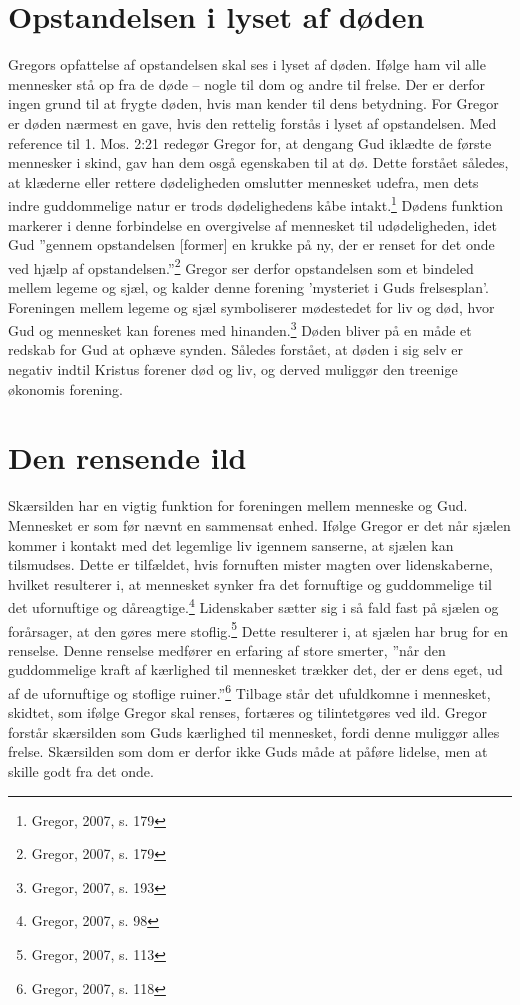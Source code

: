 \section{Opstandelsen i lyset af døden}
Gregors opfattelse af opstandelsen skal ses i lyset af døden. Ifølge ham vil alle mennesker stå op fra de døde -- nogle til dom og andre til frelse. Der er derfor ingen grund til at frygte døden, hvis man kender til dens betydning. For Gregor er døden nærmest en gave, hvis den rettelig forstås i lyset af opstandelsen. Med reference til 1. Mos. 2:21 redegør Gregor for, at dengang Gud iklædte de første mennesker i skind, gav han dem osgå egenskaben til at dø. Dette forstået således, at klæderne eller rettere dødeligheden omslutter mennesket udefra, men dets indre guddommelige natur er trods dødelighedens kåbe intakt.\footnote{Gregor, 2007, s. 179} Dødens funktion markerer i denne forbindelse en overgivelse af mennesket til udødeligheden, idet Gud ”gennem opstandelsen [former] en krukke på ny, der er renset for det onde ved hjælp af opstandelsen.”\footnote{Gregor, 2007, s. 179} Gregor ser derfor opstandelsen som et bindeled mellem legeme og sjæl, og kalder denne forening 'mysteriet i Guds frelsesplan'. Foreningen mellem legeme og sjæl symboliserer mødestedet for liv og død, hvor Gud og mennesket kan forenes med hinanden.\footnote{Gregor, 2007, s. 193} Døden bliver på en måde et redskab for Gud at ophæve synden. Således forstået, at døden i sig selv er negativ indtil Kristus forener død og liv, og derved muliggør den treenige økonomis forening.

\section{Den rensende ild}
Skærsilden har en vigtig funktion for foreningen mellem menneske og Gud. Mennesket er som før nævnt en sammensat enhed. Ifølge Gregor er det når sjælen kommer i kontakt med det legemlige liv igennem sanserne, at sjælen kan tilsmudses. Dette er tilfældet, hvis fornuften mister magten over lidenskaberne, hvilket resulterer i, at mennesket synker fra det fornuftige og guddommelige til det ufornuftige og dåreagtige.\footnote{Gregor, 2007, s. 98} Lidenskaber sætter sig i så fald fast på sjælen og forårsager, at den gøres mere stoflig.\footnote{Gregor, 2007, s. 113} Dette resulterer i, at sjælen har brug for en renselse. Denne renselse medfører en erfaring af store smerter, ”når den guddommelige kraft af kærlighed til mennesket trækker det, der er dens eget, ud af de ufornuftige og stoflige ruiner.”\footnote{Gregor, 2007, s. 118} Tilbage står det ufuldkomne i mennesket, skidtet, som ifølge Gregor skal renses, fortæres og tilintetgøres ved ild. Gregor forstår skærsilden som Guds kærlighed til mennesket, fordi denne muliggør alles frelse. Skærsilden som dom er derfor ikke Guds måde at påføre lidelse, men at skille godt fra det onde.

